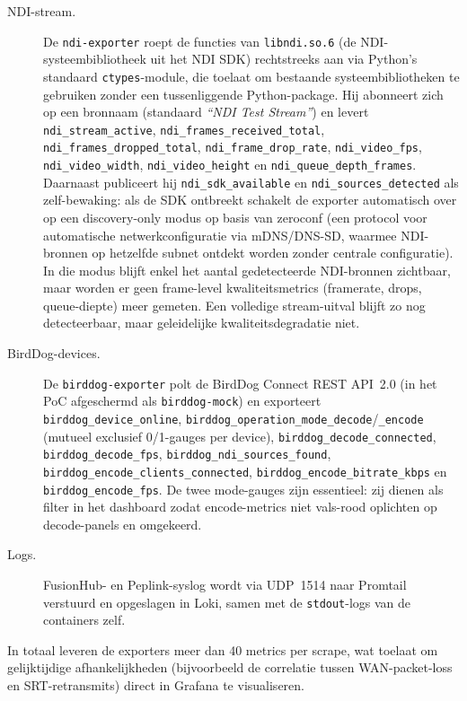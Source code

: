 \begin{description}
  \item[NDI-stream.] De \texttt{ndi-exporter} roept de functies van \texttt{libndi.so.6} (de NDI-systeembibliotheek uit het NDI SDK) rechtstreeks aan via Python's standaard \texttt{ctypes}-module, die toelaat om bestaande systeembibliotheken te gebruiken zonder een tussenliggende Python-package. Hij abonneert zich op een bronnaam (standaard \emph{``NDI Test Stream''}) en levert \texttt{ndi\_stream\_active}, \texttt{ndi\_frames\_received\_total}, \texttt{ndi\_frames\_dropped\_total}, \texttt{ndi\_frame\_drop\_rate}, \texttt{ndi\_video\_fps}, \texttt{ndi\_video\_width}, \texttt{ndi\_video\_height} en \texttt{ndi\_queue\_depth\_frames}. Daarnaast publiceert hij \texttt{ndi\_sdk\_available} en \texttt{ndi\_sources\_detected} als zelf-bewaking: als de SDK ontbreekt schakelt de exporter automatisch over op een discovery-only modus op basis van zeroconf (een protocol voor automatische netwerkconfiguratie via mDNS/DNS-SD, waarmee NDI-bronnen op hetzelfde subnet ontdekt worden zonder centrale configuratie). In die modus blijft enkel het aantal gedetecteerde NDI-bronnen zichtbaar, maar worden er geen frame-level kwaliteitsmetrics (framerate, drops, queue-diepte) meer gemeten. Een volledige stream-uitval blijft zo nog detecteerbaar, maar geleidelijke kwaliteitsdegradatie niet.
  \item[BirdDog-devices.] De \texttt{birddog-exporter} polt de BirdDog Connect REST API~2.0 \autocite{BirdDogAPI2024} (in het PoC afgeschermd als \texttt{birddog-mock}) en exporteert \texttt{birddog\_device\_online}, \texttt{birddog\_operation\_mode\_decode}/\texttt{\_encode} (mutueel exclusief 0/1-gauges per device), \texttt{birddog\_decode\_connected}, \texttt{birddog\_decode\_fps}, \texttt{birddog\_ndi\_sources\_found}, \texttt{birddog\_encode\_clients\_connected}, \texttt{birddog\_encode\_bitrate\_kbps} en \texttt{birddog\_encode\_fps}. De twee mode-gauges zijn essentieel: zij dienen als filter in het dashboard zodat encode-metrics niet vals-rood oplichten op decode-panels en omgekeerd.
  \item[Logs.] FusionHub- en Peplink-syslog wordt via UDP~1514 naar Promtail verstuurd en opgeslagen in Loki, samen met de \texttt{stdout}-logs van de containers zelf.
\end{description}

In totaal leveren de exporters meer dan 40 metrics per scrape, wat toelaat om gelijktijdige afhankelijkheden (bijvoorbeeld de correlatie tussen WAN-packet-loss en SRT-retransmits) direct in Grafana te visualiseren.

